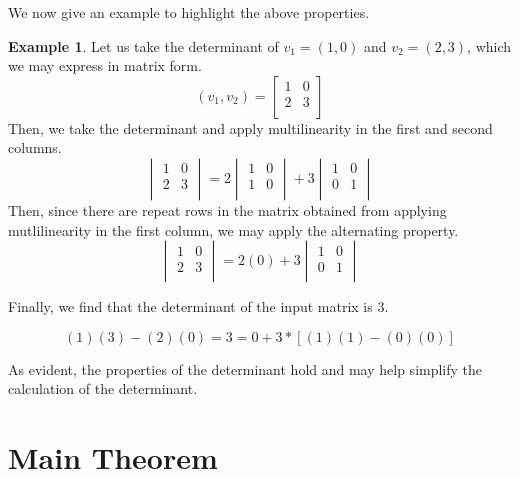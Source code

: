 \documentclass[11pt,reqno]{amsart}
\theoremstyle{definition}
\newtheorem{example}[theorem]{Example}
\begin{document}
We now give an example to highlight the above properties. 

\begin{example}
\label{ex:1}
Let us take the determinant of $v_1=(1,0)$ and $v_2=(2,3)$, which we may express in matrix form. 
    \[ (v_1, v_2) = 
    \begin{bmatrix}
        1 & 0 \\
        2 & 3\\
    \end{bmatrix}
    \]
    Then, we take the determinant and apply multilinearity in the first and second columns.
    \[
    \begin{vmatrix}
        1 & 0 \\
        2 & 3\\
    \end{vmatrix} = 2
    \begin{vmatrix}
        1 & 0 \\
        1 & 0\\
    \end{vmatrix}
    + 3
    \begin{vmatrix}
        1 & 0 \\
        0 & 1\\
    \end{vmatrix}
    \]
    Then, since there are repeat rows in the matrix obtained from applying mutlilinearity in the first column, we may apply the alternating property.
    \[
    \begin{vmatrix}
        1 & 0 \\
        2 & 3\\
    \end{vmatrix} 
    = 2(0) + 3
    \begin{vmatrix}
        1 & 0\\
        0 & 1\\
    \end{vmatrix}
    \]

    Finally, we find that the determinant of the input matrix is 3.

    \[
    (1)(3)-(2)(0) = 3 = 0 + 3*[(1)(1)-(0)(0)]
    \]


    As evident, the properties of the determinant hold and may help simplify the calculation of the determinant. 

\end{example}



\section{Main Theorem}
\label{sec:proof}
\end{document}
